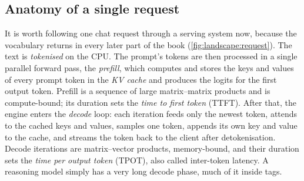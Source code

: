 \subsection{Anatomy of a single request}\label{sec:landscape:request}
It is worth following one chat request through a serving system now, because the vocabulary returns in
every later part of the book (\cref{fig:landscape:request}). The text is \emph{tokenised} on the CPU.
The prompt's tokens are then processed in a single parallel forward pass, the \emph{prefill}, which
computes and stores the keys and values of every prompt token in the \emph{KV cache} and produces the
logits for the first output token. Prefill is a sequence of large matrix--matrix products and is
compute-bound; its duration sets the \emph{time to first token} (TTFT). After that, the engine enters the
\emph{decode} loop: each iteration feeds only the newest token, attends to the cached keys and values,
samples one token, appends its own key and value to the cache, and streams the token back to the client
after detokenisation. Decode iterations are matrix--vector products, memory-bound, and their duration sets
the \emph{time per output token} (TPOT), also called inter-token latency. A reasoning model simply has a
very long decode phase, much of it inside  tags.

